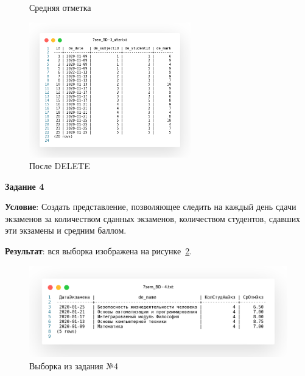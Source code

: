 \begin{figure}[!h]
\begin{minipage}{0.49\textwidth}
    \caption{Средняя отметка}
    \label{fig:t3_temp}
  \end{minipage}
  \begin{minipage}{0.49\textwidth}
    \centering

    \includegraphics[width=7cm]
    {../sql/task3/3_after.png}

    \caption{После DELETE}
    \label{fig:t3_2}
  \end{minipage}
\end{figure}

\newpage

\begin{center}
  \textbf{Задание 4}
\end{center}

\textbf{Условие}:
Создать представление, позволяющее следить на каждый день сдачи экзаменов за количеством сданных экзаменов,
количеством студентов, сдавших эти экзамены и средним баллом.



\textbf{Результат}: вся выборка изображена на рисунке~\ref{fig:t4}.

\begin{figure}[!h]
  \centering

  \includegraphics[width=18cm]
  {../sql/task4/4.png}

  \caption{Выборка из задания №4}

  \label{fig:t4}
\end{figure}

